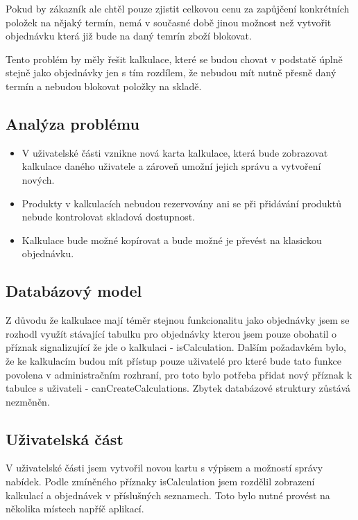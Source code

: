 Pokud by zákazník ale chtěl pouze zjistit celkovou cenu za zapůjčení konkrétních položek na nějaký termín, nemá v současné době jinou možnost než vytvořit objednávku která již bude na daný temrín zboží blokovat.

Tento problém by měly řešit kalkulace, které se budou chovat v podstatě úplně stejně jako objednávky jen s tím rozdílem, že nebudou mít nutně přesně daný termín a nebudou blokovat položky na skladě.

\subsection{Analýza problému}

\begin{itemize}
    \item V uživatelské části vznikne nová karta kalkulace, která bude zobrazovat kalkulace daného uživatele a zároveň umožní jejich správu a vytvoření nových.
    \item Produkty v kalkulacích nebudou rezervovány ani se při přidávání produktů nebude kontrolovat skladová dostupnost.
    \item Kalkulace bude možné kopírovat a bude možné je převést na klasickou objednávku.
\end{itemize}

\subsection{Databázový model}

Z důvodu že kalkulace mají téměr stejnou funkcionalitu jako objednávky jsem se rozhodl využít stávající tabulku pro objednávky kterou jsem pouze obohatil o příznak signalizující že jde o kalkulaci - isCalculation. 
Dalším požadavkém bylo, že ke kalkulacím budou mít přístup pouze uživatelé pro které bude tato funkce povolena v administračním rozhraní, pro toto bylo potřeba přidat nový příznak k tabulce s uživateli - canCreateCalculations. Zbytek databázové struktury zůstává nezměněn. 

\subsection{Uživatelská část}

V uživatelské části jsem vytvořil novou kartu s výpisem a možností správy nabídek. Podle zmíněného příznaky isCalculation jsem rozdělil zobrazení kalkulací a objednávek v příslušných seznamech. Toto bylo nutné provést na několika místech napříč aplikací.

